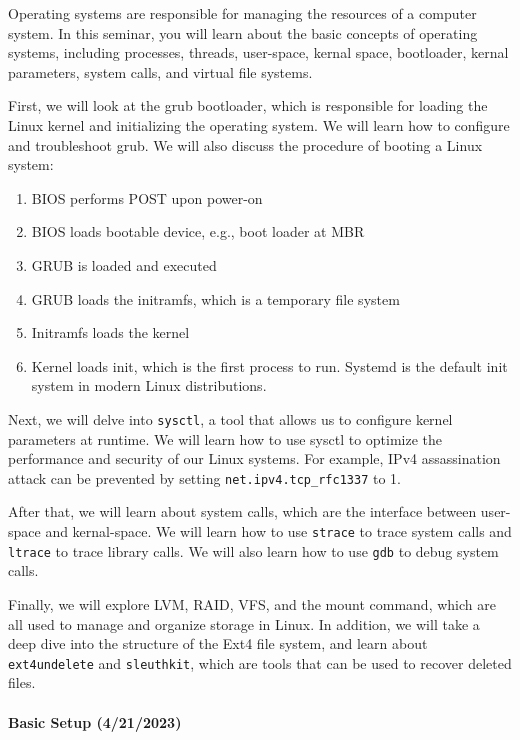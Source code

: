 \documentclass[
  letterpaper,
  DIV=11,
  numbers=noendperiod]{scrartcl}
\let\oldparagraph\paragraph
\renewcommand{\paragraph}[1]{\oldparagraph{#1}\mbox{}}
\providecommand{\tightlist}{%
  \setlength{\itemsep}{0pt}\setlength{\parskip}{0pt}}\usepackage{longtable,booktabs,array}
\begin{document}
Operating systems are responsible for managing the resources of a
computer system. In this seminar, you will learn about the basic
concepts of operating systems, including processes, threads, user-space,
kernal space, bootloader, kernal parameters, system calls, and virtual
file systems.

First, we will look at the grub bootloader, which is responsible for
loading the Linux kernel and initializing the operating system. We will
learn how to configure and troubleshoot grub. We will also discuss the
procedure of booting a Linux system:

\begin{enumerate}
\def\labelenumi{\arabic{enumi}.}
\tightlist
\item
  BIOS performs POST upon power-on
\item
  BIOS loads bootable device, e.g., boot loader at MBR
\item
  GRUB is loaded and executed
\item
  GRUB loads the initramfs, which is a temporary file system
\item
  Initramfs loads the kernel
\item
  Kernel loads init, which is the first process to run. Systemd is the
  default init system in modern Linux distributions.
\end{enumerate}

Next, we will delve into \texttt{sysctl}, a tool that allows us to
configure kernel parameters at runtime. We will learn how to use sysctl
to optimize the performance and security of our Linux systems. For
example, IPv4 assassination attack can be prevented by setting
\texttt{net.ipv4.tcp\_rfc1337} to 1.

After that, we will learn about system calls, which are the interface
between user-space and kernal-space. We will learn how to use
\texttt{strace} to trace system calls and \texttt{ltrace} to trace
library calls. We will also learn how to use \texttt{gdb} to debug
system calls.

Finally, we will explore LVM, RAID, VFS, and the mount command, which
are all used to manage and organize storage in Linux. In addition, we
will take a deep dive into the structure of the Ext4 file system, and
learn about \texttt{ext4undelete} and \texttt{sleuthkit}, which are
tools that can be used to recover deleted files.

\hypertarget{basic-setup-4212023}{%
\paragraph{Basic Setup (4/21/2023)}\label{basic-setup-4212023}}
\end{document}
